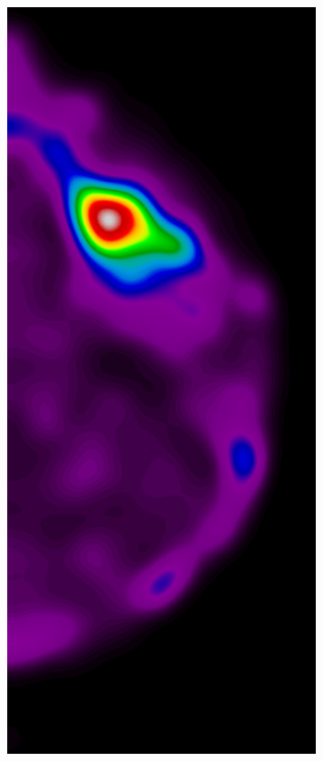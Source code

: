 \documentclass{beamer}
\begin{document}
\begin{frame}
\begin{figure}
\begin{subfigure}{0.134\textwidth}
            \end{subfigure}
            \begin{subfigure}{0.134\textwidth}
	            \centering
		            \includegraphics[width=\textwidth]{plots/examples/example2_probs_1_3.png}

\end{subfigure}
\end{figure}
\end{frame}
\end{document}
